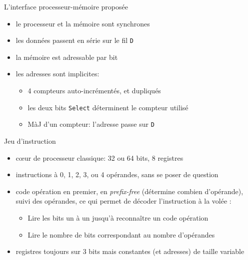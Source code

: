 \documentclass[slidetop,11pt,table]{beamer}
\begin{document}
\begin{frame}{L'interface processeur-mémoire proposée}
  \begin{figure}[b]
    \begin{center}
      \scalebox{0.8}{\proco}
    \end{center}
  \end{figure}
  \begin{itemize}
  \item le processeur et la mémoire sont synchrones
  \item les données passent en série sur le fil \texttt{D}
  \item la mémoire est adressable par bit
  \item les adresses sont implicites:
    \begin{itemize}
    \item 4 compteurs auto-incrémentés, et dupliqués
    \item les deux bits \texttt{Select} déterminent le compteur utilisé
    \item MàJ d'un compteur: l'adresse passe sur  \texttt{D}
    \end{itemize}
  \end{itemize}
\end{frame}


\begin{frame}{Jeu d'instruction}
  \begin{itemize}
  \item cœur de processeur classique: 32 ou 64 bits, 8 registres
  \item instructions à 0, 1, 2, 3, ou 4 opérandes, sans se poser de question
  \item code opération en premier, en {\it prefix-free} (détermine combien d'opérande), suivi des opérandes, ce qui permet de décoder l’instruction à la volée :
    \begin{itemize}
  \item Lire les bits un à un jusqu’à reconnaître un code opération
  \item Lire le nombre de bits correspondant au nombre d’opérandes
  \end{itemize}

  \item registres toujours sur 3 bits mais constantes (et adresses) de taille variable
  \end{itemize}
\end{frame}
\end{document}
